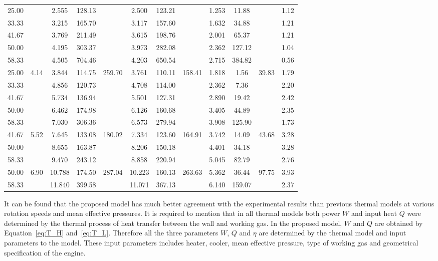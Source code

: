 \begin{table}
\begin{center}
\begin{tabular}{cccccccccccc}
		25.00	&&2.555	&128.13	&&2.500	&123.21	&&1.253	&11.88	&&1.12\\
		33.33	&&3.215	&165.70	&&3.117	&157.60	&&1.632	&34.88	&&1.21\\
		41.67	&&3.769	&211.49	&&3.615	&198.76	&&2.001	&65.37	&&1.21\\
		50.00	&&4.195	&303.37	&&3.973	&282.08	&&2.362	&127.12	&&1.04\\
		58.33	&&4.505	&704.46	&&4.203	&650.54	&&2.715	&384.82	&&0.56\\
		\midrule
		25.00	&\multirow{5}{*}{4.14}	&3.844	&114.75	&\multirow{5}{*}{259.70}	&3.761	&110.11	&\multirow{5}{*}{158.41}	&1.818	&1.56	&\multirow{5}{*}{39.83}	&1.79\\
		33.33	&&4.856	&120.73	&&4.708	&114.00	&&2.362	&7.36	&&2.20\\
		41.67	&&5.734	&136.94	&&5.501	&127.31	&&2.890	&19.42	&&2.42\\
		50.00	&&6.462	&174.98	&&6.126	&160.68	&&3.405	&44.89	&&2.35\\
		58.33	&&7.030	&306.36	&&6.573	&279.94	&&3.908	&125.90	&&1.73\\
		\midrule
		41.67	&\multirow{3}{*}{5.52}	&7.645	&133.08	&\multirow{3}{*}{180.02}	&7.334	&123.60	&\multirow{3}{*}{164.91}	&3.742	&14.09	&\multirow{3}{*}{43.68}	&3.28\\
		50.00	&&8.655	&163.87	&&8.206	&150.18	&&4.401	&34.18	&&3.28\\
		58.33	&&9.470	&243.12	&&8.858	&220.94	&&5.045	&82.79	&&2.76\\
		\midrule
		50.00	&\multirow{2}{*}{6.90}	&10.788	&174.50	&\multirow{2}{*}{287.04}	&10.223	&160.13	&\multirow{2}{*}{263.63}	&5.362	&36.44	&\multirow{2}{*}{97.75}		&3.93\\
		58.33	&&11.840	&399.58	&&11.071	&367.13	&&6.140	&159.07	&&2.37\\
		\bottomrule
	\end{tabular}
	\end{center}
	\label{tab:PowerComparison}
\end{table}

It can be found that the proposed model has much better agreement with the experimental results than previous thermal models at various rotation speeds and mean effective pressures. It is required to mention that in all thermal models both power $W$ and input heat $Q$ were determined by the thermal process of heat transfer between the wall and working gas. In the proposed model, $W$ and $Q$ are obtained by Equation~\ref{eq:T_H} and~\ref{eq:T_L}. Therefore all the three parameters $W$, $Q$ and $\eta$ are determined by the thermal model and input parameters to the model. These input parameters includes heater, cooler, mean effective pressure, type of working gas and geometrical specification of the engine.

